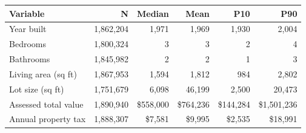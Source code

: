 \begin{tabular}{lrrrrr}
\toprule
Variable & N & Median & Mean & P10 & P90 \\
\midrule
Year built & 1,862,204 & 1,971 & 1,969 & 1,930 & 2,004 \\
Bedrooms & 1,800,324 & 3 & 3 & 2 & 4 \\
Bathrooms & 1,845,982 & 2 & 2 & 1 & 3 \\
Living area (sq ft) & 1,867,953 & 1,594 & 1,812 & 984 & 2,802 \\
Lot size (sq ft) & 1,751,679 & 6,098 & 46,199 & 2,500 & 20,473 \\
Assessed total value & 1,890,940 & \$558,000 & \$764,236 & \$144,284 & \$1,501,236 \\
Annual property tax & 1,888,307 & \$7,581 & \$9,995 & \$2,535 & \$18,991 \\
\bottomrule
\end{tabular}

